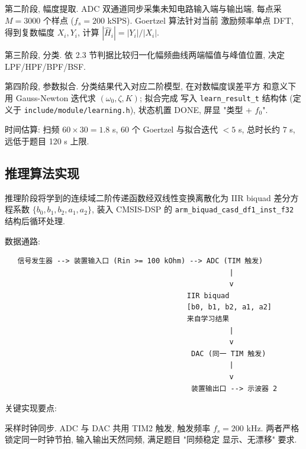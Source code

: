 \documentclass[a4paper]{article}
\begin{document}
第二阶段, 幅度提取. ADC 双通道同步采集未知电路输入端与输出端,
每点采 $M = 3000$ 个样点 ($f_s = 200$ kSPS). Goertzel 算法针对当前
激励频率单点 DFT, 得到复数幅度 $X_i, Y_i$, 计算
$|\hat H_i| = |Y_i|/|X_i|$.

第三阶段, 分类. 依 2.3 节判据比较归一化幅频曲线两端幅值与峰值位置,
决定 LPF/HPF/BPF/BSF.

第四阶段, 参数拟合. 分类结果代入对应二阶模型, 在对数幅度误差平方
和意义下用 Gauss-Newton 迭代求 $(\omega_{0}, \zeta, K)$; 拟合完成
写入 \texttt{learn\_result\_t} 结构体 (定义于
\texttt{include/module/learning.h}), 状态机置 DONE, 屏显 "类型 +
$f_{0}$".

时间估算: 扫频 $60 \times 30 = 1.8$ s, 60 个 Goertzel 与拟合迭代
$< 5$ s, 总时长约 $7$ s, 远低于题目 120 s 上限.


\subsection{推理算法实现}

推理阶段将学到的连续域二阶传递函数经双线性变换离散化为 IIR biquad
差分方程系数 $\{b_0, b_1, b_2, a_1, a_2\}$, 装入 CMSIS-DSP 的
\texttt{arm\_biquad\_casd\_df1\_inst\_f32} 结构后循环处理.

数据通路:

\begin{center}
\begin{minipage}{0.90\textwidth}
\begin{verbatim}
   信号发生器 --> 装置输入口 (Rin >= 100 kOhm) --> ADC (TIM 触发)
                                                     |
                                                     v
                                           IIR biquad
                                           [b0, b1, b2, a1, a2]
                                           来自学习结果
                                                     |
                                                     v
                                            DAC (同一 TIM 触发)
                                                     |
                                                     v
                                            装置输出口 --> 示波器 2
\end{verbatim}
\end{minipage}
\end{center}

关键实现要点:

采样时钟同步. ADC 与 DAC 共用 TIM2 触发, 触发频率 $f_s = 200$ kHz.
两者严格锁定同一时钟节拍, 输入输出天然同频, 满足题目 "同频稳定
显示、无漂移" 要求.
\end{document}
